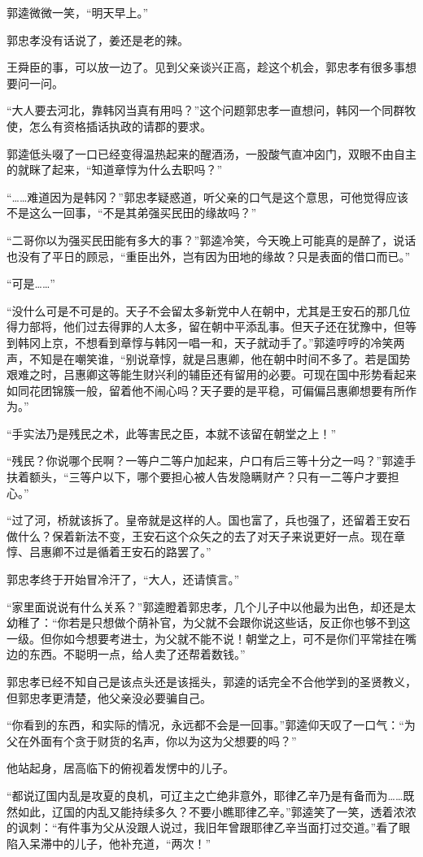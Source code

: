 郭逵微微一笑，“明天早上。”

郭忠孝没有话说了，姜还是老的辣。

王舜臣的事，可以放一边了。见到父亲谈兴正高，趁这个机会，郭忠孝有很多事想要问一问。

“大人要去河北，靠韩冈当真有用吗？”这个问题郭忠孝一直想问，韩冈一个同群牧使，怎么有资格插话执政的请郡的要求。

郭逵低头啜了一口已经变得温热起来的醒酒汤，一股酸气直冲囟门，双眼不由自主的就眯了起来，“知道章惇为什么去职吗？”

“……难道因为是韩冈？”郭忠孝疑惑道，听父亲的口气是这个意思，可他觉得应该不是这么一回事，“不是其弟强买民田的缘故吗？”

“二哥你以为强买民田能有多大的事？”郭逵冷笑，今天晚上可能真的是醉了，说话也没有了平日的顾忌，“重臣出外，岂有因为田地的缘故？只是表面的借口而已。”

“可是……”

“没什么可是不可是的。天子不会留太多新党中人在朝中，尤其是王安石的那几位得力部将，他们过去得罪的人太多，留在朝中平添乱事。但天子还在犹豫中，但等到韩冈上京，不想看到章惇与韩冈一唱一和，天子就动手了。”郭逵哼哼的冷笑两声，不知是在嘲笑谁，“别说章惇，就是吕惠卿，他在朝中时间不多了。若是国势艰难之时，吕惠卿这等能生财兴利的辅臣还有留用的必要。可现在国中形势看起来如同花团锦簇一般，留着他不闹心吗？天子要的是平稳，可偏偏吕惠卿想要有所作为。”

“手实法乃是残民之术，此等害民之臣，本就不该留在朝堂之上！”

“残民？你说哪个民啊？一等户二等户加起来，户口有后三等十分之一吗？”郭逵手扶着额头，“三等户以下，哪个要担心被人告发隐瞒财产？只有一二等户才要担心。”

“过了河，桥就该拆了。皇帝就是这样的人。国也富了，兵也强了，还留着王安石做什么？保着新法不变，王安石这个众矢之的去了对天子来说更好一点。现在章惇、吕惠卿不过是循着王安石的路罢了。”

郭忠孝终于开始冒冷汗了，“大人，还请慎言。”

“家里面说说有什么关系？”郭逵瞪着郭忠孝，几个儿子中以他最为出色，却还是太幼稚了：“你若是只想做个荫补官，为父就不会跟你说这些话，反正你也够不到这一级。但你如今想要考进士，为父就不能不说！朝堂之上，可不是你们平常挂在嘴边的东西。不聪明一点，给人卖了还帮着数钱。”

郭忠孝已经不知自己是该点头还是该摇头，郭逵的话完全不合他学到的圣贤教义，但郭忠孝更清楚，他父亲没必要骗自己。

“你看到的东西，和实际的情况，永远都不会是一回事。”郭逵仰天叹了一口气：“为父在外面有个贪于财货的名声，你以为这为父想要的吗？”

他站起身，居高临下的俯视着发愣中的儿子。

“都说辽国内乱是攻夏的良机，可辽主之亡绝非意外，耶律乙辛乃是有备而为……既然如此，辽国的内乱又能持续多久？不要小瞧耶律乙辛。”郭逵笑了一笑，透着浓浓的讽刺：“有件事为父从没跟人说过，我旧年曾跟耶律乙辛当面打过交道。”看了眼陷入呆滞中的儿子，他补充道，“两次！”

